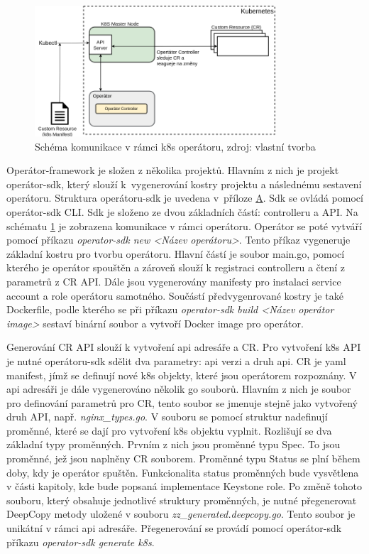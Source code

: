 \begin{figure}[H]
\begin{centering}
\includegraphics[width=0.8\textwidth]{img/sdk-api.png}
\par\end{centering}
\caption{Schéma komunikace v rámci k8s operátoru, zdroj: vlastní tvorba} \label{fig:sdk-api}
\end{figure}

Operátor-framework je složen z několika projektů. Hlavním z nich je projekt operátor-sdk, který slouží k vygenerování kostry projektu a následnému sestavení operátoru. Struktura operátoru-sdk je uvedena v příloze \hyperref[atch:tree]{A}. Sdk se ovládá pomocí operátor-sdk CLI. Sdk je složeno ze dvou základních částí: controlleru a API. Na schématu \ref{fig:sdk-api} je zobrazena komunikace v rámci operátoru. Operátor se poté vytváří pomocí příkazu \textit{operator-sdk new <Název operátoru>}. Tento příkaz vygeneruje základní kostru pro tvorbu operátoru. Hlavní částí je soubor main.go, pomocí kterého je operátor spouštěn a zároveň slouží k registraci controlleru a čtení z parametrů z CR API. Dále jsou vygenerovány manifesty pro instalaci service account a role operátoru samotného. Součástí předvygenrované kostry je také Dockerfile, podle kterého se při příkazu \textit{operator-sdk build <Název operátor image>} sestaví binární soubor a vytvoří Docker image pro operátor.

Generování CR API slouží k vytvoření api adresáře a CR. Pro vytvoření k8s API je nutné operátoru-sdk sdělit dva parametry: api verzi a druh api. CR je yaml manifest, jímž se definují nové k8s objekty, které jsou operátorem rozpoznány. V api adresáři je dále vygenerováno několik go souborů. Hlavním z nich je soubor pro definování parametrů pro CR, tento soubor se jmenuje stejně jako vytvořený druh API, např. \textit{nginx\_types.go}. V souboru se pomocí struktur nadefinují proměnné, které se dají pro vytvoření k8s objektu vyplnit. Rozlišují se dva základní typy proměnných. Prvním z nich jsou proměnné typu Spec. To jsou proměnné, jež jsou naplněny CR souborem. Proměnné typu Status se plní během doby, kdy je operátor spuštěn. Funkcionalita status proměnných bude vysvětlena v části kapitoly, kde bude popsaná implementace Keystone role. Po změně tohoto souboru, který obsahuje jednotlivé struktury proměnných, je nutné přegenerovat DeepCopy metody uložené v souboru \textit{zz\_generated.deepcopy.go}. Tento soubor je unikátní v rámci api adresáře. Přegenerování se provádí pomocí operátor-sdk příkazu \textit{operator-sdk generate k8s}.

